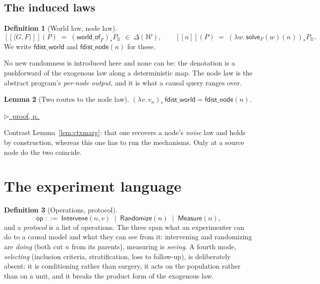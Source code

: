 \documentclass[11pt,a4paper]{article}
\theoremstyle{definition}
\newtheorem{definition}{Definition}[section]
\theoremstyle{plain}
\newtheorem{lemma}[definition]{Lemma}
\theoremstyle{remark}
\newcommand{\Ctx}{\mathcal{U}}         %
\newcommand{\Wld}{\mathcal{W}}         %
\newcommand{\solve}{\mathsf{solve}}
\newcommand{\Dist}[1]{\Delta(#1)}      %
\newcommand{\push}[1]{{#1}_{*}}        %
\providecommand{\llbracket}{[\![}
\providecommand{\rrbracket}{]\!]}
\newcommand{\pfref}[1]{%
  \par\smallskip\noindent
  \hyperref[pf:#1]{\small$\triangleright$\ proof, p.\,\pageref{pf:#1}}\par\smallskip}
\begin{document}
\subsection{The induced laws}

\begin{definition}[World law, node law]
\[
  \llbracket \langle G,F\rangle \rrbracket (P)
  \;=\;
  \push{(\mathsf{world\_of}_F)} P_\Ctx
  \;\in\; \Dist{\Wld},
  \qquad
  \llbracket n \rrbracket (P)
  \;=\;
  \push{(\lambda w.\, \solve_F(w)(n))} P_\Ctx .
\]
We write $\mathsf{fdist\_world}$ and $\mathsf{fdist\_node}(n)$ for these.
\end{definition}

No new randomness is introduced here and none can be: the denotation is a
pushforward of the exogenous law along a deterministic map. The node law
is the abstract program's \emph{per-node output}, and it is what a causal
query ranges over.

\begin{lemma}[Two routes to the node law]
\label{lem:tworoutes}
$\push{(\lambda v.\, v_n)}\,\mathsf{fdist\_world} = \mathsf{fdist\_node}(n)$.
\end{lemma}

\pfref{lem:tworoutes}

Contrast Lemma~\ref{lem:ctxmarg}: that one recovers a node's \emph{noise}
law and holds by construction, whereas this one has to run the mechanisms.
Only at a source node do the two coincide.

\section{The experiment language}

\begin{definition}[Operations, protocol]
\[
  \mathsf{op} \;::=\;
  \mathsf{Intervene}(n,v) \;\mid\;
  \mathsf{Randomize}(n) \;\mid\;
  \mathsf{Measure}(n),
\]
and a \emph{protocol} is a list of operations. The three span what an
experimenter can do to a causal model and what they can see from it:
intervening and randomizing are \emph{doing} (both cut $n$ from its
parents), measuring is \emph{seeing}. A fourth mode, \emph{selecting}
(inclusion criteria, stratification, loss to follow-up), is deliberately
absent: it is conditioning rather than surgery, it acts on the population
rather than on a unit, and it breaks the product form of the exogenous
law.
\end{definition}
\end{document}
